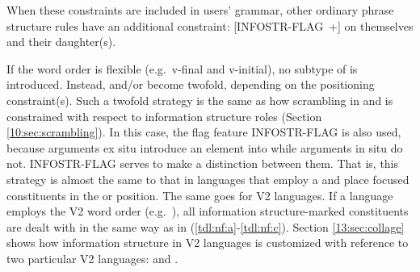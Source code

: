 




\noindent When these constraints are included in users' grammar, other
ordinary phrase structure rules have an additional constraint:
\mbox{[INFOSTR-FLAG +]} on themselves and their daughter(s).



If the word order is flexible (e.g.\ v-final and v-initial), no
subtype of  is introduced. Instead,
 and/or  become twofold,
depending on the positioning constraint(s).  Such a twofold strategy
is the same as how scrambling in  and  is
constrained with respect to information structure roles
(Section \ref{10:sec:scrambling}). In this case, the
flag feature INFOSTR-FLAG is also used, because arguments ex
situ introduce an  element into  while
arguments in situ do not. INFOSTR-FLAG serves to make a
distinction between them. That is, this strategy is almost the same to
that in languages that employ a  and place
focused constituents in the  or 
position. The same goes for V2 languages.  If a language employs the
V2 word order (e.g.\ ), all information structure-marked
constituents are dealt with in the same way as in
(\ref{tdl:nf:a}-\ref{tdl:nf:c}).  Section \ref{13:sec:collage} shows how
information structure in V2 languages is customized with reference to
two particular V2 languages:  and .


